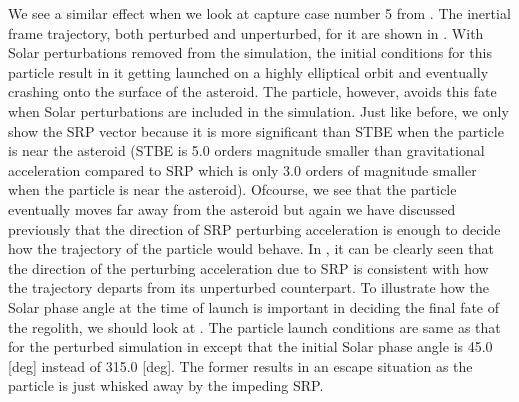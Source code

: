 We see a similar effect when we look at capture case number 5 from . The inertial frame trajectory, both perturbed and unperturbed, for it are shown in . With Solar perturbations removed from the simulation, the initial conditions for this particle result in it getting launched on a highly elliptical orbit and eventually crashing onto the surface of the asteroid. The particle, however, avoids this fate when Solar perturbations are included in the simulation. Just like before, we only show the \gls{SRP} vector because it is more significant than \gls{STBE} when the particle is near the asteroid (\gls{STBE} is 5.0 orders magnitude smaller than gravitational acceleration compared to \gls{SRP} which is only 3.0 orders of magnitude smaller when the particle is near the asteroid). Ofcourse, we see that the particle eventually moves far away from the asteroid but again we have discussed previously that the direction of \gls{SRP} perturbing acceleration is enough to decide how the trajectory of the particle would behave. In , it can be clearly seen that the direction of the perturbing acceleration due to \gls{SRP} is consistent with how the trajectory departs from its unperturbed counterpart. To illustrate how the Solar phase angle at the time of launch is important in deciding the final fate of the regolith, we should look at . The particle launch conditions are same as that for the perturbed simulation in  except that the initial Solar phase angle is 45.0 [deg] instead of 315.0 [deg]. The former results in an escape situation as the particle is just whisked away by the impeding \gls{SRP}.

